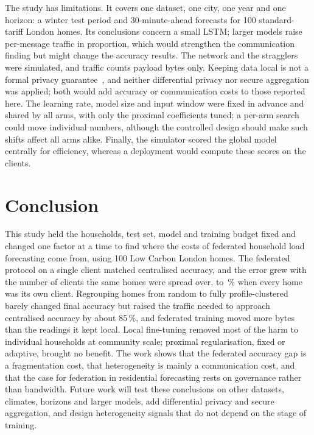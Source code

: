 The study has limitations. It covers one dataset, one city, one year and one horizon: a winter test period and
30-minute-ahead forecasts for 100 standard-tariff London homes. Its conclusions concern a small LSTM; larger models
raise per-message traffic in proportion, which would strengthen the communication finding but might change the
accuracy results. The network and the stragglers were simulated, and traffic counts payload bytes only. Keeping data
local is not a formal privacy guarantee~\cite{zhu2019leakage,geiping2020inverting}, and neither differential privacy
nor secure aggregation was applied; both would add accuracy or communication costs to those reported here. The
learning rate, model size and input window were fixed in advance and shared by all arms, with only the proximal
coefficients tuned; a per-arm search could move individual numbers, although the controlled design should make such
shifts affect all arms alike. Finally, the simulator scored the global model centrally for efficiency, whereas a
deployment would compute these scores on the clients.

\section{Conclusion}

This study held the households, test set, model and training budget fixed and changed one factor at a time to find
where the costs of federated household load forecasting come from, using 100 Low Carbon London homes. The federated protocol on a single client matched centralised accuracy, and the error grew with the number of
clients the same homes were spread over, to \nosign{\EonethreefedavghouseholdGap}\,\% when every home was its own
client. Regrouping homes from random to fully profile-clustered barely changed final accuracy but raised the traffic
needed to approach centralised accuracy by about 85\,\%, and federated training moved more bytes than the readings it
kept local. Local fine-tuning removed most of the harm to individual households at community scale; proximal regularisation,
fixed or adaptive, brought no benefit. The work
shows that the federated accuracy gap is a fragmentation cost, that heterogeneity is mainly a communication cost, and
that the case for federation in residential forecasting rests on governance rather than bandwidth. Future work will
test these conclusions on other datasets, climates, horizons and larger models, add differential privacy and secure
aggregation, and design heterogeneity signals that do not depend on the stage of training.

